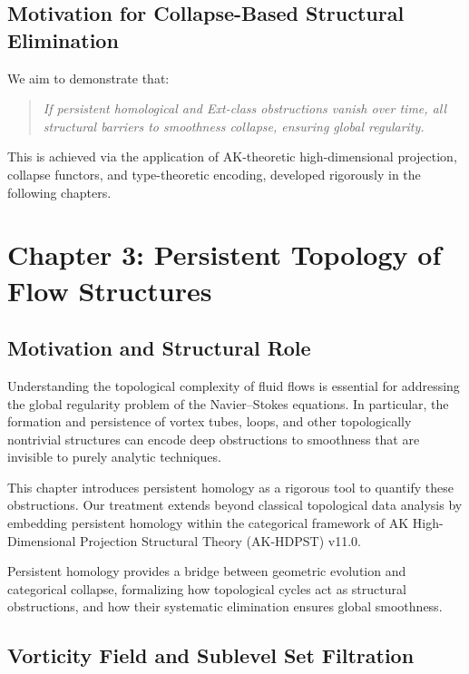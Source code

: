 \documentclass[11pt]{article}
\begin{document}
\subsection{Motivation for Collapse-Based Structural Elimination}

We aim to demonstrate that:

\begin{quote}
\textit{If persistent homological and Ext-class obstructions vanish over time, all structural barriers to smoothness collapse, ensuring global regularity.}
\end{quote}

This is achieved via the application of AK-theoretic high-dimensional projection, collapse functors, and type-theoretic encoding, developed rigorously in the following chapters.



\section{Chapter 3: Persistent Topology of Flow Structures}

\subsection{Motivation and Structural Role}

Understanding the topological complexity of fluid flows is essential for addressing the global regularity problem of the Navier–Stokes equations. In particular, the formation and persistence of vortex tubes, loops, and other topologically nontrivial structures can encode deep obstructions to smoothness that are invisible to purely analytic techniques.

This chapter introduces persistent homology as a rigorous tool to quantify these obstructions. Our treatment extends beyond classical topological data analysis by embedding persistent homology within the categorical framework of AK High-Dimensional Projection Structural Theory (AK-HDPST) v11.0.

Persistent homology provides a bridge between geometric evolution and categorical collapse, formalizing how topological cycles act as structural obstructions, and how their systematic elimination ensures global smoothness.

\subsection{Vorticity Field and Sublevel Set Filtration}
\end{document}
